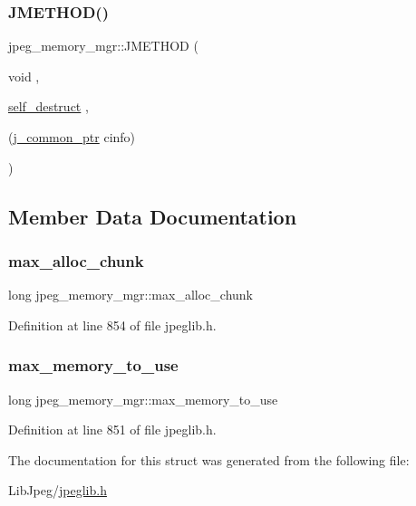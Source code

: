 \mbox{\label{structjpeg__memory__mgr_ae80ddea0ba4f845f91d3a30e350b5f44}} 
\subsubsection{\texorpdfstring{JMETHOD()}{JMETHOD()}\hspace{0.1cm}{\footnotesize\ttfamily [11/11]}}
{\footnotesize\ttfamily jpeg\+\_\+memory\+\_\+mgr\+::\+J\+M\+E\+T\+H\+OD (\begin{DoxyParamCaption}\item[{void}]{,  }\item[{\mbox{\hyperlink{jmemmgr_8c_a089178751c0bf3ab81082fcf2a3fab5c}{self\+\_\+destruct}}}]{,  }\item[{(\mbox{\hyperlink{jpeglib_8h_a1a177ab705cefea8f30ec31a48e62650}{j\+\_\+common\+\_\+ptr}} cinfo)}]{ }\end{DoxyParamCaption})}



\subsection{Member Data Documentation}
\mbox{\label{structjpeg__memory__mgr_a0301712c8796bb5555093d72b37c5a58}} 
\subsubsection{\texorpdfstring{max\_alloc\_chunk}{max\_alloc\_chunk}}
{\footnotesize\ttfamily long jpeg\+\_\+memory\+\_\+mgr\+::max\+\_\+alloc\+\_\+chunk}



Definition at line 854 of file jpeglib.\+h.

\mbox{\label{structjpeg__memory__mgr_aa7ef7c0d7ffbfcbee837ae9cb8b12c7e}} 
\subsubsection{\texorpdfstring{max\_memory\_to\_use}{max\_memory\_to\_use}}
{\footnotesize\ttfamily long jpeg\+\_\+memory\+\_\+mgr\+::max\+\_\+memory\+\_\+to\+\_\+use}



Definition at line 851 of file jpeglib.\+h.



The documentation for this struct was generated from the following file\+:\begin{DoxyCompactItemize}
\item 
Lib\+Jpeg/\mbox{\hyperlink{jpeglib_8h}{jpeglib.\+h}}\end{DoxyCompactItemize}
